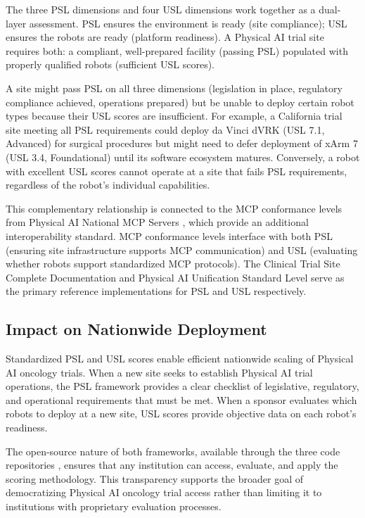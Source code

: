 The three PSL dimensions and four USL dimensions work together as a dual-layer
assessment. PSL ensures the environment is ready (site compliance); USL ensures
the robots are ready (platform readiness). A Physical AI trial site requires
both: a compliant, well-prepared facility (passing PSL) populated with properly
qualified robots (sufficient USL scores).

A site might pass PSL on all three dimensions (legislation in place, regulatory
compliance achieved, operations prepared) but be unable to deploy certain robot
types because their USL scores are insufficient. For example, a California
trial site meeting all PSL requirements could deploy da Vinci dVRK (USL 7.1,
Advanced) for surgical procedures but might need to defer deployment of xArm 7
(USL 3.4, Foundational) until its software ecosystem matures. Conversely, a
robot with excellent USL scores cannot operate at a site that fails PSL
requirements, regardless of the robot's individual capabilities.

This complementary relationship is connected to the MCP conformance levels from
Physical AI National MCP Servers \cite{national-mcp-paper}, which provide an
additional interoperability standard. MCP conformance levels interface with
both PSL (ensuring site infrastructure supports MCP communication) and USL
(evaluating whether robots support standardized MCP protocols). The Clinical
Trial Site Complete Documentation \cite{site-docs} and Physical AI Unification
Standard Level \cite{usl-standard} serve as the primary reference
implementations for PSL and USL respectively.

\subsection{Impact on Nationwide Deployment}
\label{subsec:standards-impact}

Standardized PSL and USL scores enable efficient nationwide scaling of Physical
AI oncology trials. When a new site seeks to establish Physical AI trial
operations, the PSL framework provides a clear checklist of legislative,
regulatory, and operational requirements that must be met. When a sponsor
evaluates which robots to deploy at a new site, USL scores provide objective
data on each robot's readiness.

The open-source nature of both frameworks, available through the three code
repositories \cite{main-repo, mcp-repo, fl-repo}, ensures that any institution
can access, evaluate, and apply the scoring methodology. This transparency
supports the broader goal of democratizing Physical AI oncology trial access
rather than limiting it to institutions with proprietary evaluation processes.

